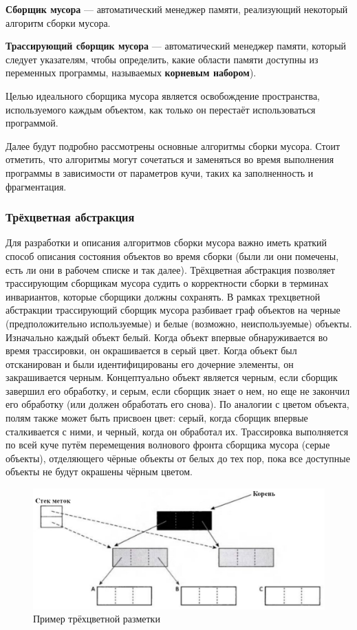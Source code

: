 \textbf{Сборщик мусора} \cite{glossary} --- автоматический менеджер памяти, реализующий некоторый алгоритм сборки мусора.

\textbf{Трассирующий сборщик мусора} \cite{recycling} --- автоматический менеджер памяти, который следует указателям, чтобы определить, какие области памяти доступны из переменных программы, называемых \textbf{корневым набором}).

Целью идеального сборщика мусора является освобождение пространства, используемого каждым объектом, как только он перестаёт использоваться программой.

Далее будут подробно рассмотрены основные алгоритмы сборки мусора. Стоит отметить, что алгоритмы могут сочетаться и заменяться во время выполнения программы в зависимости от параметров кучи, таких ка заполненность и фрагментация. \cite{handbook}

\subsubsection{Трёхцветная абстракция}
\label{tricolor}

Для разработки и описания алгоритмов сборки мусора важно иметь краткий способ описания состояния объектов во время сборки (были ли они помечены, есть ли они в рабочем списке и так далее). Трёхцветная абстракция позволяет трассирующим сборщикам мусора судить о корректности сборки в терминах инвариантов, которые сборщики должны сохранять. В рамках трехцветной абстракции трассирующий сборщик мусора разбивает граф объектов на черные (предположительно используемые) и белые (возможно, неиспользуемые) объекты. Изначально каждый объект белый. Когда объект впервые обнаруживается во время трассировки, он окрашивается в серый цвет. Когда объект был отсканирован и были идентифицированы его дочерние элементы, он закрашивается черным. Концептуально объект является черным, если сборщик завершил его обработку, и серым, если сборщик знает о нем, но еще не закончил его обработку (или должен обработать его снова). По аналогии с цветом объекта, полям также может быть присвоен цвет: серый, когда сборщик впервые сталкивается с ними, и черный, когда он обработал их. Трассировка выполняется по всей куче путём перемещения волнового фронта сборщика мусора (серые объекты), отделяющего чёрные объекты от белых до тех пор, пока все доступные объекты не будут окрашены чёрным цветом. \cite{handbook}

\begin{figure}[H]
	\centering
	\includegraphics[width=\textwidth]{assets/tricolor.png}
	\caption{Пример трёхцветной разметки}
	\label{fig:tricolor}
\end{figure}

